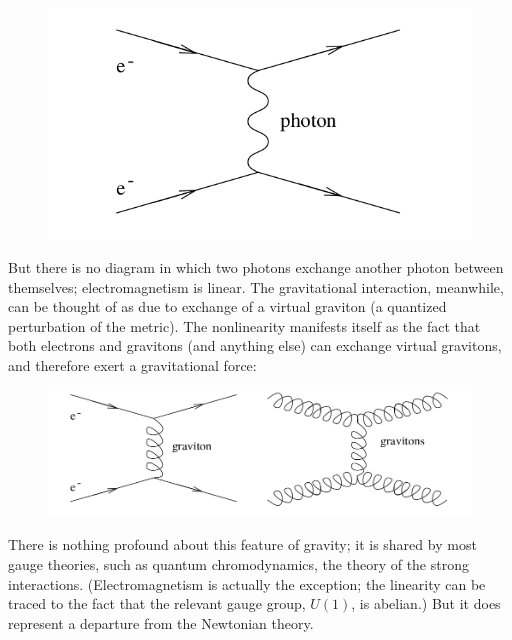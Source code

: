 \begin{figure}[h!]
	\centering
	\includegraphics[width=0.7\linewidth]{gfx/QEDDiagram}
	\caption{}
	\label{fig:qeddiagram}
\end{figure}
But there is no diagram in which two photons exchange another photon between themselves;
electromagnetism is linear. The gravitational interaction, meanwhile, can be thought of
as due to exchange of a virtual graviton (a quantized perturbation of the metric). The
nonlinearity manifests itself as the fact that both electrons and gravitons (and anything
else) can exchange virtual gravitons, and therefore exert a gravitational force:

\begin{figure}[h!]
	\centering
	\includegraphics[width=0.7\linewidth]{gfx/GravityDiagram}
	\caption{}
	\label{fig:gravitydiagram}
\end{figure}

There is nothing profound about this feature of gravity; it is shared by most gauge theories,
such as quantum chromodynamics, the theory of the strong interactions. (Electromagnetism
is actually the exception; the linearity can be traced to the fact that the relevant gauge group,
$U(1)$, is abelian.) But it does represent a departure from the Newtonian theory.




































